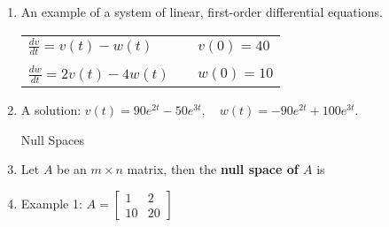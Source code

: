 \documentclass[11pt,fleqn]{article}
\newcommand{\bbm}{\begin{bmatrix}}
\newcommand{\ebm}{\end{bmatrix}}
\begin{document}
\renewcommand{\headrulewidth}{0pt}
\newcommand{\blank}[1]{\rule{#1}{0.75pt}}
\renewcommand{\d}{\displaystyle}
\vspace*{-0.7in}
\begin{center}
 \textbf{ \large {} }
\end{center}
\begin{enumerate}
\item An example of a system of linear, first-order differential equations.\\

\begin{tabular}{lll}
$\frac{dv}{dt}=v(t)-w(t)$&\quad&$v(0)=40$\\
&&\\
$\frac{dw}{dt}=2v(t)-4w(t)$&\quad&$w(0)=10$
\end{tabular}

\item A solution: $v(t)=90e^{2t}-50e^{3t}, \quad w(t)=-90e^{2t}+100e^{3t}.$
\newpage

\begin{center} Null Spaces \end{center}
\item Let $A$ be an $m \times n$ matrix, then the \textbf{null space of $A$} is
\vspace{1in}
\item Example 1: $A=\bbm 1&2\\10&20 \ebm$\\

\vfill


\end{enumerate}
\end{document}
